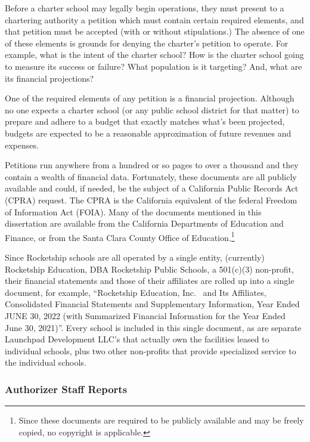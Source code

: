 Before a charter school may legally begin operations, they must present to a chartering authority a petition which must contain certain required elements, and that petition must be accepted (with or without stipulations.) The absence of one of these elements is grounds for denying the charter's petition to operate. For example, what is the intent of the charter school? How is the charter school going to measure its success or failure? What population is it targeting? And, what are its financial projections? 

One of the required elements of any petition is a financial projection. Although no one expects a charter school (or any public school district for that matter) to prepare and adhere to a budget that exactly matches what's been projected, budgets are expected to be a reasonable approximation of future revenues and expenses.

Petitions run anywhere from a hundred or so pages to over a thousand and they contain a wealth of financial data. Fortunately, these documents are all publicly available and could, if needed, be the subject of a California Public Records Act (CPRA) request. The CPRA is the California equivalent of the federal Freedom of Information Act (FOIA). Many of the documents mentioned in this dissertation are available from the California Departments of Education and Finance, or from the Santa Clara County Office of Education.\footnote{Since these documents are required to be publicly available and may be freely copied, no copyright is applicable.}

Since Rocketship schools are all operated by a single entity, (currently) Rocketship Education, DBA Rocketship Public Schools, a 501(c)(3) non-profit, their financial statements and those of their affiliates are rolled up into a single document, for example, ``Rocketship Education, Inc.  and Its Affiliates, Consolidated Financial Statements and Supplementary Information, Year Ended JUNE 30, 2022
(with Summarized Financial Information for the Year Ended June 30, 2021)''.  Every school is included in this single document, as are separate Launchpad Development LLC's that actually own the facilities leased to individual schools, plus two other non-profits that provide specialized service to the individual schools. %

\subsubsection{Authorizer Staff Reports}\label{sec:cs-staff-reports}\indent

